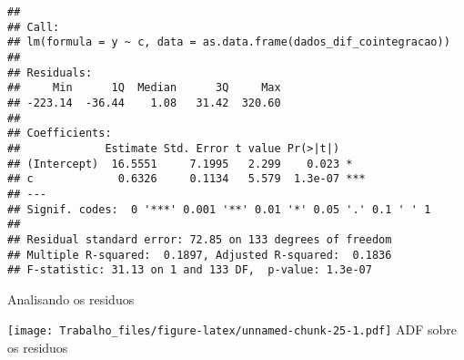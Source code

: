\documentclass[
]{article}
\newenvironment{Shaded}{\begin{snugshade}}{\end{snugshade}}
\newcommand{\AttributeTok}[1]{\textcolor[rgb]{0.13,0.29,0.53}{#1}}
\newcommand{\DecValTok}[1]{\textcolor[rgb]{0.00,0.00,0.81}{#1}}
\newcommand{\FunctionTok}[1]{\textcolor[rgb]{0.13,0.29,0.53}{\textbf{#1}}}
\newcommand{\NormalTok}[1]{#1}
\newcommand{\OtherTok}[1]{\textcolor[rgb]{0.56,0.35,0.01}{#1}}
\newcommand{\SpecialCharTok}[1]{\textcolor[rgb]{0.81,0.36,0.00}{\textbf{#1}}}
\newcommand{\StringTok}[1]{\textcolor[rgb]{0.31,0.60,0.02}{#1}}
\begin{document}
\begin{verbatim}
## 
## Call:
## lm(formula = y ~ c, data = as.data.frame(dados_dif_cointegracao))
## 
## Residuals:
##     Min      1Q  Median      3Q     Max 
## -223.14  -36.44    1.08   31.42  320.60 
## 
## Coefficients:
##             Estimate Std. Error t value Pr(>|t|)    
## (Intercept)  16.5551     7.1995   2.299    0.023 *  
## c             0.6326     0.1134   5.579  1.3e-07 ***
## ---
## Signif. codes:  0 '***' 0.001 '**' 0.01 '*' 0.05 '.' 0.1 ' ' 1
## 
## Residual standard error: 72.85 on 133 degrees of freedom
## Multiple R-squared:  0.1897, Adjusted R-squared:  0.1836 
## F-statistic: 31.13 on 1 and 133 DF,  p-value: 1.3e-07
\end{verbatim}

Analisando os residuos

\begin{Shaded}
\end{Shaded}

\texttt{[image: Trabalho\_files/figure-latex/unnamed-chunk-25-1.pdf]} ADF
sobre os residuos

\begin{Shaded}
\end{Shaded}
\end{document}
